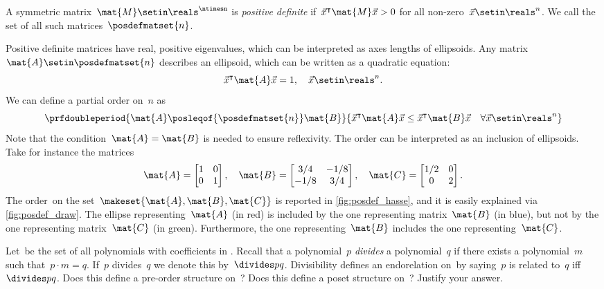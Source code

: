 \begin{definition}
    \label{def:posdef}
    A symmetric matrix~$\mat{M}\setin \reals^{\ntimesn}$ is \emph{positive definite} if~$\vec{x}^\intercal \mat{M}\vec{x}> 0$ for all non-zero~$\vec{x}\setin \reals^n$.
    We call the set of all such matrices~$\posdefmatset{n}$.
\end{definition}
Positive definite matrices have real, positive eigenvalues, which can be interpreted as axes lengths of ellipsoids.
Any matrix~$\mat{A}\setin \posdefmatset{n}$ describes an ellipsoid, which can be written as a quadratic equation:
\begin{equation}
    \label{eq:posdef-ellipsoid}
    \vec{x}^\intercal \mat{A}\vec{x}=1,\quad \vec{x}\setin \reals^n.
\end{equation}
We can define a partial order on~$n$ as
\begin{equation}
    \label{eq:posdef-order}
    \prfdoubleperiod{
        \mat{A}\posleqof{\posdefmatset{n}} \mat{B}
    }{
        \vec{x}^\intercal \mat{A}\vec{x}\leq \vec{x}^\intercal \mat{B}\vec{x} \quad \forall \vec{x}\setin \reals^n
    }
\end{equation}
Note that the condition~$\mat{A}=\mat{B}$ is needed to ensure reflexivity.
The order can be interpreted as an inclusion of ellipsoids.
Take for instance the matrices
\begin{equation}
    \label{eq:posdef-matrices}
    \mat{A}=
    \begin{bmatrix}
        1 & 0 \\0& 1
    \end{bmatrix}, \quad \mat{B}=
    \begin{bmatrix}
        3/4 & -1/8 \\-1/8& 3/4
    \end{bmatrix},\quad \mat{C}=
    \begin{bmatrix}
        1/2 & 0 \\0& 2
    \end{bmatrix}.
\end{equation}
The order~\posA on the set~$\makeset{\mat{A},\mat{B},\mat{C}}$ is reported in \cref{fig:posdef_hasse}, and it is easily explained via \cref{fig:posdef_draw}.
The ellipse representing~$\mat{A}$ (in red) is included by the one representing matrix~$\mat{B}$ (in blue), but not by the one representing matrix~$\mat{C}$ (in green).
Furthermore, the one representing~$\mat{B}$ includes the one representing~$\mat{C}$.

\vfill
\begin{gradedexercise}
    \label{ex:PolynomialDivisibility}
    Let~\setA be the set of all polynomials with coefficients in \reals.
    Recall that a polynomial~$p$ \emph{divides} a polynomial~$q$ if there exists a polynomial~$m$ such that~$p \cdot m = q$.
    If~$p$ divides~$q$ we denote this by~$\divides p q$.
    Divisibility defines an endorelation on~\setA by saying~$p$ is related to~$q$ iff~$\divides p q$.
    Does this define a pre-order structure on~\setA?
    Does this define a poset structure on~\setA?
    Justify your answer.
\end{gradedexercise}

